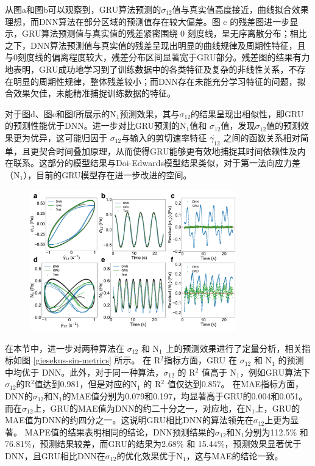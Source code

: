 从图a和图b可以观察到，GRU算法预测的$\sigma_{12}$值与真实值高度接近，曲线拟合效果理想，而DNN算法在部分区域的预测值存在较大偏差。图 c 的残差图进一步显示，GRU算法预测值与真实值的残差紧密围绕 0 刻度线，呈无序离散分布；相比之下，DNN算法预测值与真实值的残差呈现出明显的曲线规律及周期性特征，且与0刻度线的偏离程度较大，残差分布区间显著宽于GRU部分。残差图的结果有力地表明，GRU成功地学习到了训练数据中的各类特征及复杂的非线性关系，不存在明显的周期性规律，整体残差较小；而DNN存在未能充分学习特征的问题，拟合效果欠佳，未能精准捕捉训练数据的特征。

对于图d、图e和图f所展示的N$_{1}$预测效果，其与$\sigma_{12}$的结果呈现出相似性，即GRU的预测性能优于DNN。进一步对比GRU预测的N$_{1}$值和 $\sigma_{12}$值，发现$\sigma_{12}$值的预测效果更为优异，这可能归因于 $\sigma_{12}$与输入的剪切速率特征 $\dot{\gamma_{12}}$ 之间的函数关系相对简单，且更契合时间叠加原理，从而使得GRU能够更有效地捕捉其时间依赖性及内在联系。这部分的模型结果与Doi-Edwards模型结果类似，对于第一法向应力差（N$_1$），目前的GRU模型存在进一步改进的空间。
\begin{figure}[htbp]
  \centering
  \includegraphics[width=0.8\textwidth]{Fig/giesekus_sin.pdf}
  \FigureBicaption{\label{giesekus_sin}}{}
\end{figure}
在本节中，进一步对两种算法在 $\sigma_{12}$ 和 N$_{1}$ 上的预测效果进行了定量分析，相关指标如图 \ref{giesekus-sin-metrics} 所示。
在 R$^2$指标方面，GRU 在 $\sigma_{12}$ 和 N$_{1}$ 的预测中均优于 DNN。此外，对于同一种算法，$\sigma_{12}$ 的 R$^2$ 值高于 N$_{1}$，例如GRU算法下$\sigma_{12}$的R$^2$值达到0.981，但是对应的N$_{1}$ 的 R$^2$ 值仅达到0.857。
在MAE指标方面，DNN的$\sigma_{12}$和N$_{1}$的MAE值分别为0.079和0.197，均显著高于GRU的0.004和0.051。而在$\sigma_{12}$上，GRU的MAE值为DNN的约二十分之一，对应地，在N$_1$上，GRU的MAE值为DNN的约四分之一。这说明GRU相比DNN的算法领先在$\sigma_{12}$上更为显著。
MAPE值的结果表明相同的结论，DNN预测结果的$\sigma_{12}$和N$_1$分别为112.5\% 和76.81\%，预测结果较差，而GRU的结果为2.68\% 和 15.44\%，预测效果显著优于DNN，且GRU相比DNN在$\sigma_{12}$的优化效果优于N$_1$，这与MAE的结论一致。
